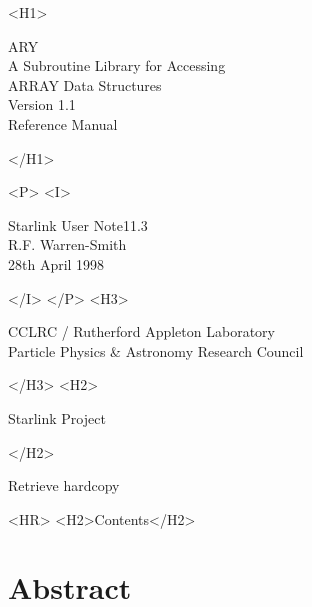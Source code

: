 \documentclass[twoside,11pt]{article}
\newcommand{\stardoccategory}  {Starlink User Note}
\newcommand{\stardocsource}    {sun\stardocnumber}
\newcommand{\stardocnumber}    {11.3}
\newcommand{\stardocauthors}   {R.F. Warren-Smith}
\newcommand{\stardocdate}      {28th April 1998}
\newcommand{\stardoctitle}     {ARY\\[2.5ex]
                                A Subroutine Library for Accessing\\
                                ARRAY Data Structures}
\newcommand{\stardocversion}   {Version 1.1}
\newcommand{\stardocmanual}    {Reference Manual}
\newcommand{\htmladdnormallink}[2]{#1}
\newcommand{\htmladdimg}[1]{}
\newcommand{\htmlref}[2]{#1}
\newcommand{\htmladdtonavigation}[1]{}
\newcommand{\xlabel}[1]{}
\newcommand{\latexonlytoc}[0]{\tableofcontents}
\begin{document}
\begin{htmlonly}
   \xlabel{}
   \begin{rawhtml} <H1> \end{rawhtml}
      \stardoctitle\\
      \stardocversion\\
      \stardocmanual
   \begin{rawhtml} </H1> \end{rawhtml}


   \begin{rawhtml} <P> <I> \end{rawhtml}
   \stardoccategory \stardocnumber \\
   \stardocauthors \\
   \stardocdate
   \begin{rawhtml} </I> </P> <H3> \end{rawhtml}
      \htmladdnormallink{CCLRC}{http://www.cclrc.ac.uk} /
      \htmladdnormallink{Rutherford Appleton Laboratory}
                        {http://www.cclrc.ac.uk/ral} \\
      \htmladdnormallink{Particle Physics \& Astronomy Research Council}
                        {http://www.pparc.ac.uk} \\
   \begin{rawhtml} </H3> <H2> \end{rawhtml}
      \htmladdnormallink{Starlink Project}{http://star-www.rl.ac.uk/}
   \begin{rawhtml} </H2> \end{rawhtml}
   \htmladdnormallink{\htmladdimg{source.gif} Retrieve hardcopy}
      {http://star-www.rl.ac.uk/cgi-bin/hcserver?\stardocsource}\\

  \label{stardoccontents}
  \begin{rawhtml} 
    <HR>
    <H2>Contents</H2>
  \end{rawhtml}
  \renewcommand{\latexonlytoc}[0]{}
  \htmladdtonavigation{\htmlref{\htmladdimg{contents_motif.gif}}
        {stardoccontents}}

  \section{\xlabel{abstract}Abstract}
\end{htmlonly}
\end{document}
